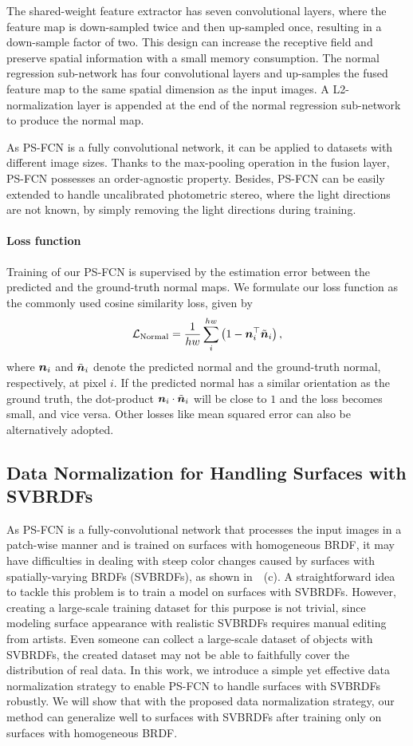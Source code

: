The shared-weight feature extractor has seven convolutional layers, where the feature map is down-sampled twice and then up-sampled once, resulting in a down-sample factor of two. This design can increase the receptive field and preserve spatial information with a small memory consumption. 
The normal regression sub-network has four convolutional layers and up-samples the fused feature map to the same spatial dimension as the input images. A L2-normalization layer is appended at the end of the normal regression sub-network to produce the normal map.

As PS-FCN is a fully convolutional network, it can be applied to datasets with different image sizes. Thanks to the max-pooling operation in the fusion layer, PS-FCN possesses an order-agnostic property. Besides, PS-FCN can be easily extended to handle uncalibrated photometric stereo, where the light directions are not known, by simply removing the light directions during training.

\paragraph{Loss function}
Training of our PS-FCN is supervised by the estimation error between the predicted and the ground-truth normal maps. We formulate our loss function as the commonly used cosine similarity loss, given by
\begin{align}
    \label{eq:normal}
    \mathcal{L}_{\text{Normal}} = \frac{1}{hw} \sum_{i}^{hw} \left(1 - \boldsymbol{n}_i^\top \tilde{\boldsymbol{n}}_{i} \right),
\end{align}
where $\boldsymbol{n}_{i}$ and $\tilde{\boldsymbol{n}}_{i}$ denote the predicted normal and the ground-truth normal, respectively, at pixel $i$.
If the predicted normal has a similar orientation as the ground truth, the dot-product $\boldsymbol{n}_{i} \cdot \tilde{\boldsymbol{n}}_{i}$ will be close to $1$ and the loss becomes small, and vice versa. Other losses like mean squared error can also be alternatively adopted.

\subsection{Data Normalization for Handling Surfaces with SVBRDFs}
As PS-FCN is a fully-convolutional network that processes the input images in a patch-wise manner and is trained on surfaces with homogeneous BRDF, it may have difficulties in dealing with steep color changes caused by surfaces with spatially-varying BRDFs (SVBRDFs), as shown in~~(c).
A straightforward idea to tackle this problem is to train a model on surfaces with SVBRDFs. However, creating a large-scale training dataset for this purpose is not trivial, since modeling surface appearance with realistic SVBRDFs requires manual editing from artists.
Even someone can collect a large-scale dataset of objects with SVBRDFs, the created dataset may not be able to faithfully cover the distribution of real data. 
In this work, we introduce a simple yet effective data normalization strategy to enable PS-FCN to handle surfaces with SVBRDFs robustly. We will show that with the proposed data normalization strategy, our method can generalize well to surfaces with SVBRDFs after training only on surfaces with homogeneous BRDF.

